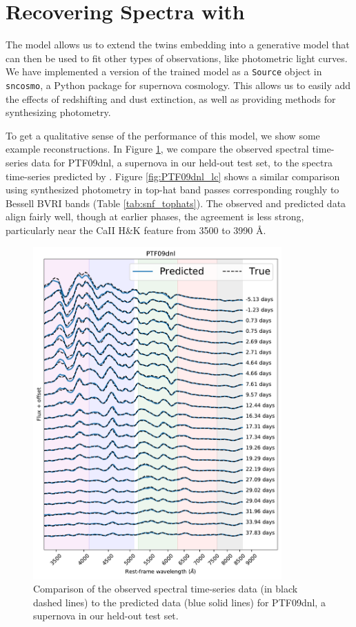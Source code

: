 \section{Recovering Spectra with \etos}
\label{sec:embed2spec_results}
The \etos{} model allows us to extend the twins embedding into a generative model that can then be used to fit other types of observations, like photometric light curves. We have implemented a version of the trained model as a \texttt{Source} object in \texttt{sncosmo}, a Python package for supernova cosmology. This allows us to easily add the effects of redshifting and dust extinction, as well as providing methods for synthesizing photometry.

To get a qualitative sense of the performance of this model, we show some example reconstructions. In Figure \ref{fig:PTF09dnl_spec}, we compare the observed spectral time-series data for PTF09dnl, a supernova in our held-out test set, to the spectra time-series predicted by \etos. Figure \ref{fig:PTF09dnl_lc} shows a similar comparison using synthesized photometry in top-hat band passes corresponding roughly to Bessell BVRI bands (Table \ref{tab:snf_tophats}). The observed and predicted data align fairly well, though at earlier phases, the agreement is less strong, particularly near the CaII H\&K feature from 3500 to 3990 \AA.

\begin{figure}
    \centering
    \includegraphics[width=0.85\textwidth]{figures/nn_twins/PTF09dnl_embed2spec.pdf}
    \caption{Comparison of the observed spectral time-series data (in black dashed lines) to the predicted data (blue solid lines) for PTF09dnl, a supernova in our held-out test set.}
    \label{fig:PTF09dnl_spec}
\end{figure}

